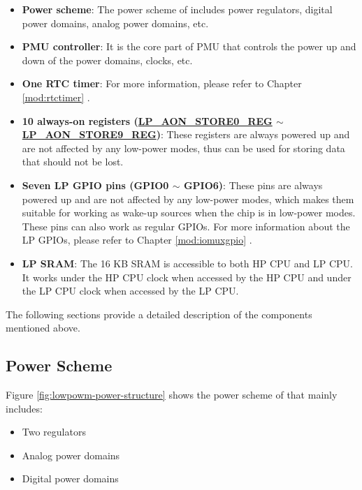 \documentclass[main\_\_EN.tex]{subfiles}
\begin{document}
\begin{itemize}
    \item \textbf{Power scheme}: The power scheme of \chipname{} includes power regulators, digital power domains, analog power domains, etc.

    \item \textbf{PMU controller}: It is the core part of PMU that controls the power up and down of the power domains, clocks, etc.

    \item \textbf{One RTC timer}: For more information, please refer to Chapter \ref{mod:rtctimer} \textit{}.

    \item \textbf{10 always-on registers (\hyperref[regdesc:LPAONSTORE0REG]{LP\_AON\_STORE0\_REG} $\sim$ \hyperref[regdesc:LPAONSTORE9REG]{LP\_AON\_STORE9\_REG})}: These registers are always powered up and are not affected by any low-power modes, thus can be used for storing data that should not be lost.

    \item \textbf{Seven LP GPIO pins (GPIO0 $\sim$ GPIO6)}: These pins are always powered up and are not affected by any low-power modes, which makes them suitable for working as wake-up sources when the chip is in low-power modes. These pins can also work as regular GPIOs. For more information about the LP GPIOs, please refer to Chapter \ref{mod:iomuxgpio} \textit{}.

    \item \textbf{LP SRAM}: The 16 KB SRAM is accessible to both HP CPU and LP CPU. It works under the HP CPU clock when accessed by the HP CPU and under the LP CPU clock when accessed by the LP CPU.

\end{itemize}

The following sections provide a detailed description of the components mentioned above.

\subsection{Power Scheme}

Figure \ref{fig:lowpowm-power-structure} shows the power scheme of \chipname{} that mainly includes:

\begin{itemize}
    \item Two regulators
    \item Analog power domains
    \item Digital power domains
\end{itemize}
\end{document}
